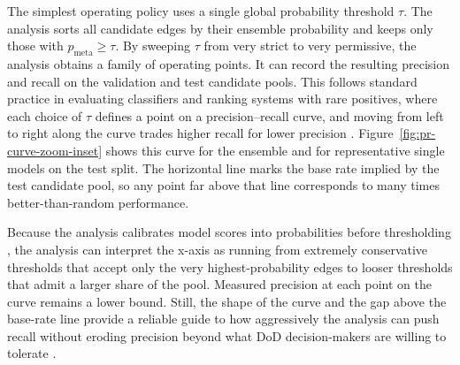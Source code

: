 The simplest operating policy uses a single global probability threshold \(\tau\). The analysis sorts all candidate edges by their ensemble probability and keeps only those with \(p_{\text{meta}} \ge \tau\). By sweeping \(\tau\) from very strict to very permissive, the analysis obtains a family of operating points. It can record the resulting precision and recall on the validation and test candidate pools. This follows standard practice in evaluating classifiers and ranking systems with rare positives, where each choice of \(\tau\) defines a point on a precision--recall curve, and moving from left to right along the curve trades higher recall for lower precision \parencite{fawcett_introduction_2006,davis_relationship_2006,manning_introduction_2008}. Figure~\ref{fig:pr-curve-zoom-inset} shows this curve for the ensemble and for representative single models on the test split. The horizontal line marks the base rate implied by the test candidate pool, so any point far above that line corresponds to many times better-than-random performance.

Because the analysis calibrates model scores into probabilities before thresholding \parencite{platt_probabilistic_1999,niculescu-mizil_predicting_2005,guo_calibration_2017}, the analysis can interpret the x-axis as running from extremely conservative thresholds that accept only the very highest-probability edges to looser thresholds that admit a larger share of the pool. Measured precision at each point on the curve remains a lower bound. Still, the shape of the curve and the gap above the base-rate line provide a reliable guide to how aggressively the analysis can push recall without eroding precision beyond what DoD decision-makers are willing to tolerate \parencite{hand_measuring_2009}.

